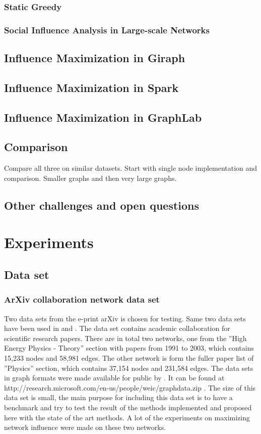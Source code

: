 \documentclass[english]{tktltiki}
\begin{document}
\subsubsection{Static Greedy}
\subsubsection{Social Influence Analysis in Large-scale Networks}
\subsection{Influence Maximization in Giraph}
\subsection{Influence Maximization in Spark}
\subsection{Influence Maximization in GraphLab}
\subsection{Comparison}
Compare all three on similar datasets. Start with single node implementation and comparison. Smaller graphs and then very large graphs.
\subsection{Other challenges and open questions}

\section{Experiments}
\subsection{Data set}
\subsubsection{ArXiv collaboration network data set}
Two data sets from the e-print arXiv is chosen for testing. Same two data sets have been used in \cite{kempe03} and \cite{chen09}. The data set contains academic collaboration for scientific research papers. There are in total two networks, one from the ''High Energy Physics - Theory'' section with papers from 1991 to 2003, which contains 15,233 nodes and 58,981 edges. The other network is form the fuller paper list of ''Physics'' section, which contains 37,154 nodes and 231,584 edges. The data sets in graph formats were made available for public by \cite{chen09}. It can be found at http://research.microsoft.com/en-us/people/weic/graphdata.zip . The size of this data set is small, the main purpose for including this data set is to have a benchmark and try to test the result of the methods implemented and proposed here with the state of the art methods. A lot of the experiments on maximizing network influence were made on these two networks.
\end{document}
